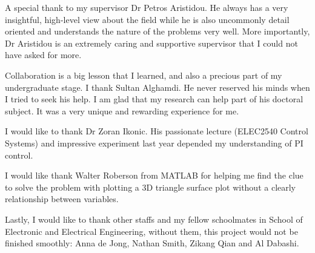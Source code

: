 A special thank to my supervisor Dr Petros Aristidou. He always has a very insightful, high-level view about the field while he is also uncommonly detail oriented and understands the nature of the problems very well. More importantly, Dr Aristidou is an extremely caring and supportive supervisor that I could not have asked for more. 

Collaboration is a big lesson that I learned, and also a precious part of my undergraduate stage. I thank Sultan Alghamdi. He never reserved his minds when I tried to seek his help. I am glad that my research can help part of his doctoral subject. It was a very unique and rewarding experience for me. 

I would like to thank Dr Zoran Ikonic. His passionate lecture (ELEC2540 Control Systems) and impressive experiment last year depended my understanding of PI control. 

I would like thank Walter Roberson from MATLAB for helping me find the clue to solve the problem with plotting a 3D triangle surface plot without a clearly relationship between variables. 

Lastly, I would like to thank other staffs and my fellow schoolmates in School of Electronic and Electrical Engineering, without them, this project would not be finished smoothly: Anna de Jong, Nathan Smith, Zikang Qian and Al Dabashi. 